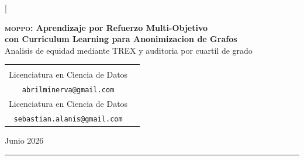 \documentclass[10pt,twocolumn,letterpaper]{article}
\newcommand{\moppo}{\textsc{moppo}}
\begin{document}
\twocolumn[{%
\begin{@twocolumnfalse}

\vspace*{0.3cm}
{\centering
  {\LARGE\bfseries
    \moppo: Aprendizaje por Refuerzo Multi-Objetivo\\[4pt]
    con Curriculum Learning para Anonimizacion de Grafos}\\[10pt]
  {\large Analisis de equidad mediante TREX y auditoria por cuartil de grado}
  \par}

\vspace{10pt}

{\centering
\begin{tabular}{cc}
  \begin{minipage}{0.45\textwidth}\centering
    {\bfseries Abril Minerva Estrada Montano}\\[2pt]
    \small Licenciatura en Ciencia de Datos\\
    \small \texttt{abrilminerva@gmail.com}
  \end{minipage}
  &
  \begin{minipage}{0.45\textwidth}\centering
    {\bfseries Sebastian Alanis Gonzalez}\\[2pt]
    \small Licenciatura en Ciencia de Datos\\
    \small \texttt{sebastian.alanis@gmail.com}
  \end{minipage}
\end{tabular}
\par}

\vspace{8pt}
{\centering\small Junio 2026\par}

\vspace{10pt}
\noindent\rule{\linewidth}{0.8pt}
\vspace{4pt}


\end{@twocolumnfalse}}
\end{document}
